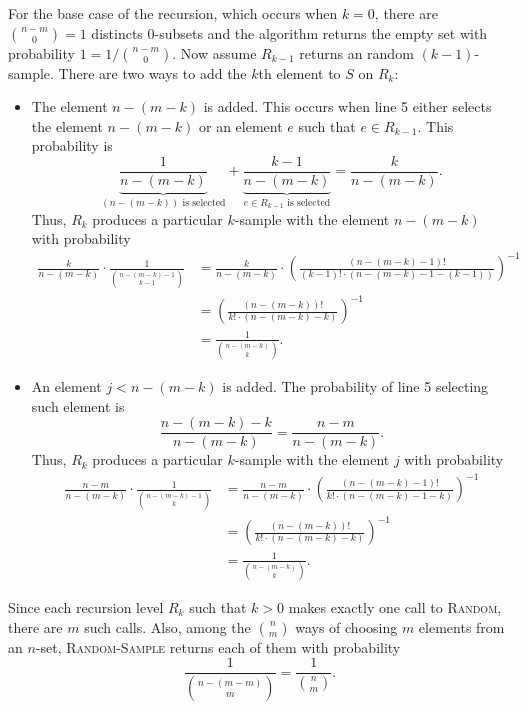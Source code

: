 \documentclass{report}
\makeatletter
\renewenvironment{framed}{%
 \def\FrameCommand##1{\hskip\@totalleftmargin
 \fboxsep=\FrameSep\fbox{##1}}%
 \MakeFramed {\advance\hsize-\width
   \@totalleftmargin\z@ \linewidth\hsize
   \@setminipage}}%
 {\par\unskip\endMakeFramed}
\makeatother
\begin{document}
\begin{enumerate}
\begin{framed}
For the base case of the recursion, which occurs when $k = 0$, there are
$\binom{n - m}{0} = 1$ distincts $0$-subsets and the algorithm returns the empty
set with probability $1 = 1/\binom{n - m}{0}$. Now assume $R_{k - 1}$ returns an
random $(k - 1)$-sample. There are two ways to add the $k$th element to $S$ on
$R_k$:
\begin{itemize}
\item The element $n - (m - k)$ is added. This occurs when line 5 either
selects the element $n - (m - k)$ or an element $e$ such that $e \in R_{k - 1}$.
This probability is
\[
  \underbrace{\frac{1}{n - (m - k)}}_\text{$(n - (m - k))$ is selected} +
  \underbrace{\frac{k - 1}{n - (m - k)}}_\text{$e \in R_{k - 1}$ is selected} = \frac{k}{n - (m - k)}.
\]
Thus, $R_k$ produces a particular $k$-sample with the element $n - (m - k)$ with
probability
\begin{equation*}
\begin{aligned}
  \frac{k}{n - (m - k)} \cdot \frac{1}{\binom{n - (m - k) - 1}{k - 1}}
  &= \frac{k}{n - (m - k)} \cdot \left(\frac{(n - (m - k) - 1)!}{(k - 1)! \cdot (n - (m - k) - 1 - (k - 1))}\right)^{-1}\\
  &= \left(\frac{(n - (m - k))!}{k! \cdot (n - (m - k) - k )}\right)^{-1}\\
  &= \frac{1}{\binom{n - (m - k)}{k}}.
\end{aligned}
\end{equation*}

\item An element $j < n - (m - k)$ is added. The probability of line 5 selecting
such element is
\[
  \frac{n - (m - k) - k}{n - (m - k)} = \frac{n - m}{n - (m - k)}.
\]
Thus, $R_k$ produces a particular $k$-sample with the element $j$ with
probability
\begin{equation*}
\begin{aligned}
  \frac{n - m}{n - (m - k)} \cdot \frac{1}{\binom{n - (m - k) - 1}{k}}
  &= \frac{n - m}{n - (m - k)} \cdot \left(\frac{(n - (m - k) - 1)!}{k! \cdot (n - (m - k) - 1 - k)}\right)^{-1}\\
  &= \left(\frac{(n - (m - k))!}{k! \cdot (n - (m - k) - k)}\right)^{-1}\\
  &= \frac{1}{\binom{n - (m - k)}{k}}.
\end{aligned}
\end{equation*}
\end{itemize}

Since each recursion level $R_k$ such that $k > 0$ makes exactly one
call to \textsc{Random}, there are $m$ such calls. Also, among the
$\binom{n}{m}$ ways of choosing $m$ elements from an $n$-set,
\textsc{Random-Sample} returns each of them with probability
\[
  \frac{1}{\binom{n - (m - m)}{m}} = \frac{1}{\binom{n}{m}}.
\]
\end{framed}

\end{enumerate}
\end{document}

